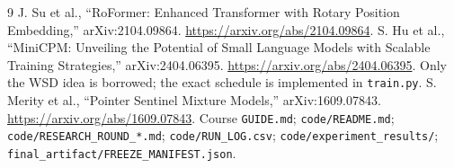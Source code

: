 \documentclass[10pt,a4paper]{article}
\begin{document}
\begin{thebibliography}{9}
 J. Su et al., ``RoFormer: Enhanced Transformer with Rotary Position Embedding,'' arXiv:2104.09864. \url{https://arxiv.org/abs/2104.09864}.
 S. Hu et al., ``MiniCPM: Unveiling the Potential of Small Language Models with Scalable Training Strategies,'' arXiv:2404.06395. \url{https://arxiv.org/abs/2404.06395}. Only the WSD idea is borrowed; the exact schedule is implemented in \texttt{train.py}.
 S. Merity et al., ``Pointer Sentinel Mixture Models,'' arXiv:1609.07843. \url{https://arxiv.org/abs/1609.07843}.
 Course \texttt{GUIDE.md}; \texttt{code/README.md}; \texttt{code/RESEARCH\_ROUND\_*.md}; \texttt{code/RUN\_LOG.csv}; \texttt{code/experiment\_results/}; \texttt{final\_artifact/FREEZE\_MANIFEST.json}.
\end{thebibliography}
\end{document}
